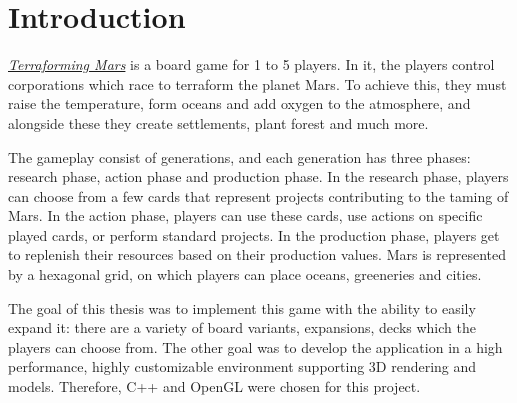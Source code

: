 \part{Introduction}
\label{intro}

\href{https://fryxgames.se/product/terraforming-mars/}{\textit{Terraforming Mars}} is a board game for 1 to 5 players. In it, the players control corporations which race to terraform the planet Mars. To achieve this, they must raise the temperature, form oceans and add oxygen to the atmosphere, and alongside these they create settlements, plant forest and much more.

The gameplay consist of generations, and each generation has three phases: research phase, action phase and production phase. In the research phase, players can choose from a few cards that represent projects contributing to the taming of Mars. In the action phase, players can use these cards, use actions on specific played cards, or perform standard projects. In the production phase, players get to replenish their resources based on their production values. Mars is represented by a hexagonal grid, on which players can place oceans, greeneries and cities.

The goal of this thesis was to implement this game with the ability to easily expand it: there are a variety of board variants, expansions, decks which the players can choose from. The other goal was to develop the application in a high performance, highly customizable environment supporting 3D rendering and models. Therefore, C++ and OpenGL were chosen for this project.
